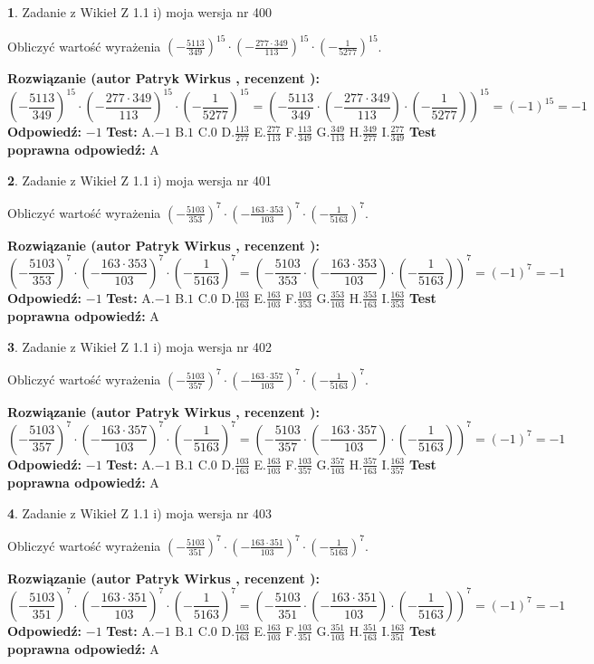 \documentclass[12pt, a4paper]{article}
\theoremstyle{definition} %
\newtheorem{zad}{}
\newcommand{\zadStart}[1]{\begin{zad}#1\newline}
\newcommand{\zadStop}{\end{zad}}
\newcommand{\rozwStart}[2]{\noindent \textbf{Rozwiązanie (autor #1 , recenzent #2): }\newline}
\newcommand{\rozwStop}{\newline}
\newcommand{\odpStart}{\noindent \textbf{Odpowiedź:}\newline}
\newcommand{\odpStop}{\newline}
\newcommand{\testStart}{\noindent \textbf{Test:}\newline}
\newcommand{\testStop}{\newline}
\newcommand{\kluczStart}{\noindent \textbf{Test poprawna odpowiedź:}\newline}
\newcommand{\kluczStop}{\newline}
\begin{document}
\zadStart{Zadanie z Wikieł Z 1.1 i) moja wersja nr 400}

Obliczyć wartość wyrażenia $(-\frac{5113}{349})^{15} \cdot (-\frac{277 \cdot 349}{113})^{15} \cdot (-\frac{1}{5277})^{15}$.
\zadStop
\rozwStart{Patryk Wirkus}{}
$$(-\frac{5113}{349})^{15} \cdot (-\frac{277 \cdot 349}{113})^{15} \cdot (-\frac{1}{5277})^{15} = (-\frac{5113}{349} \cdot (-\frac{277 \cdot 349}{113}) \cdot (-\frac{1}{5277}))^{15} = (-1)^{15} = -1$$
\rozwStop
\odpStart
$-1$
\odpStop
\testStart
A.$-1$ B.$1$ C.$0$ D.$\frac{113}{277}$ E.$\frac{277}{113}$
F.$\frac{113}{349}$ G.$\frac{349}{113}$
H.$\frac{349}{277}$
I.$\frac{277}{349}$
\testStop
\kluczStart
A
\kluczStop



\zadStart{Zadanie z Wikieł Z 1.1 i) moja wersja nr 401}

Obliczyć wartość wyrażenia $(-\frac{5103}{353})^{7} \cdot (-\frac{163 \cdot 353}{103})^{7} \cdot (-\frac{1}{5163})^{7}$.
\zadStop
\rozwStart{Patryk Wirkus}{}
$$(-\frac{5103}{353})^{7} \cdot (-\frac{163 \cdot 353}{103})^{7} \cdot (-\frac{1}{5163})^{7} = (-\frac{5103}{353} \cdot (-\frac{163 \cdot 353}{103}) \cdot (-\frac{1}{5163}))^{7} = (-1)^{7} = -1$$
\rozwStop
\odpStart
$-1$
\odpStop
\testStart
A.$-1$ B.$1$ C.$0$ D.$\frac{103}{163}$ E.$\frac{163}{103}$
F.$\frac{103}{353}$ G.$\frac{353}{103}$
H.$\frac{353}{163}$
I.$\frac{163}{353}$
\testStop
\kluczStart
A
\kluczStop



\zadStart{Zadanie z Wikieł Z 1.1 i) moja wersja nr 402}

Obliczyć wartość wyrażenia $(-\frac{5103}{357})^{7} \cdot (-\frac{163 \cdot 357}{103})^{7} \cdot (-\frac{1}{5163})^{7}$.
\zadStop
\rozwStart{Patryk Wirkus}{}
$$(-\frac{5103}{357})^{7} \cdot (-\frac{163 \cdot 357}{103})^{7} \cdot (-\frac{1}{5163})^{7} = (-\frac{5103}{357} \cdot (-\frac{163 \cdot 357}{103}) \cdot (-\frac{1}{5163}))^{7} = (-1)^{7} = -1$$
\rozwStop
\odpStart
$-1$
\odpStop
\testStart
A.$-1$ B.$1$ C.$0$ D.$\frac{103}{163}$ E.$\frac{163}{103}$
F.$\frac{103}{357}$ G.$\frac{357}{103}$
H.$\frac{357}{163}$
I.$\frac{163}{357}$
\testStop
\kluczStart
A
\kluczStop



\zadStart{Zadanie z Wikieł Z 1.1 i) moja wersja nr 403}

Obliczyć wartość wyrażenia $(-\frac{5103}{351})^{7} \cdot (-\frac{163 \cdot 351}{103})^{7} \cdot (-\frac{1}{5163})^{7}$.
\zadStop
\rozwStart{Patryk Wirkus}{}
$$(-\frac{5103}{351})^{7} \cdot (-\frac{163 \cdot 351}{103})^{7} \cdot (-\frac{1}{5163})^{7} = (-\frac{5103}{351} \cdot (-\frac{163 \cdot 351}{103}) \cdot (-\frac{1}{5163}))^{7} = (-1)^{7} = -1$$
\rozwStop
\odpStart
$-1$
\odpStop
\testStart
A.$-1$ B.$1$ C.$0$ D.$\frac{103}{163}$ E.$\frac{163}{103}$
F.$\frac{103}{351}$ G.$\frac{351}{103}$
H.$\frac{351}{163}$
I.$\frac{163}{351}$
\testStop
\kluczStart
A
\kluczStop
\end{document}
